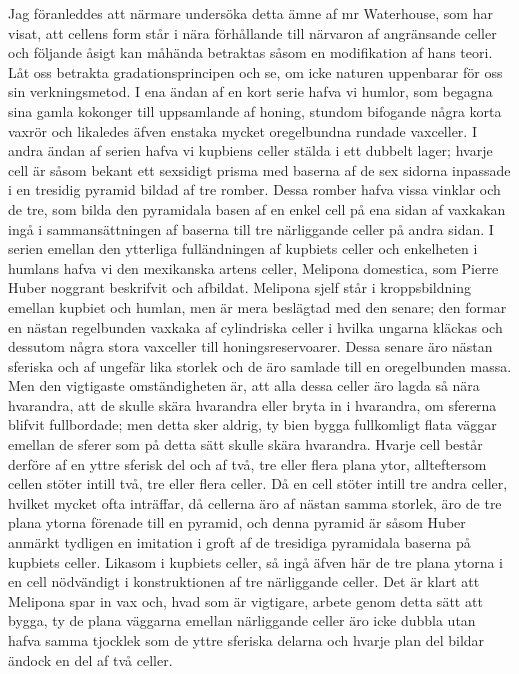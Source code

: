 Jag föranleddes att närmare undersöka detta ämne af mr Waterhouse, som har visat, att cellens form står i nära förhållande till närvaron af angränsande celler och följande åsigt kan måhända betraktas såsom en modifikation af hans teori. Låt oss betrakta gradationsprincipen och se, om icke naturen uppenbarar för oss sin verkningsmetod. I ena ändan af en kort serie hafva vi humlor, som begagna sina gamla kokonger till uppsamlande af honing, stundom bifogande några korta vaxrör och likaledes äfven enstaka mycket oregelbundna rundade vaxceller. I andra ändan af serien hafva vi kupbiens celler stälda i ett dubbelt lager; hvarje cell är såsom bekant ett sexsidigt prisma med baserna af de sex sidorna inpassade i en tresidig pyramid bildad af tre romber. Dessa romber hafva vissa vinklar och de tre, som bilda den pyramidala basen af en enkel cell på ena sidan af vaxkakan ingå i sammansättningen af baserna till tre närliggande celler på andra sidan. I serien emellan den ytterliga fulländningen af kupbiets celler och enkelheten i humlans hafva vi den mexikanska artens celler, Melipona domestica, som Pierre Huber noggrant beskrifvit och afbildat. Melipona sjelf står i kroppsbildning emellan kupbiet och humlan, men är mera beslägtad med den senare; den formar en nästan regelbunden vaxkaka af cylindriska celler i hvilka ungarna kläckas och dessutom några stora vaxceller till honingsreservoarer. Dessa senare äro nästan sferiska och af ungefär lika storlek och de äro samlade till en oregelbunden massa. Men den vigtigaste omständigheten är, att alla dessa celler äro lagda så nära hvarandra, att de skulle skära hvarandra eller bryta in i hvarandra, om sfererna blifvit fullbordade; men detta sker aldrig, ty bien bygga fullkomligt flata väggar emellan de sferer som på detta sätt skulle skära hvarandra. Hvarje cell består derföre af en yttre sferisk del och af två, tre eller flera plana ytor, allteftersom cellen stöter intill två, tre eller flera celler. Då en cell stöter intill tre andra celler, hvilket mycket ofta inträffar, då cellerna äro af nästan samma storlek, äro de tre plana ytorna förenade till en pyramid, och denna pyramid är såsom Huber anmärkt tydligen en imitation i groft af de tresidiga pyramidala baserna på kupbiets celler. Likasom i kupbiets celler, så ingå äfven här de tre plana ytorna i en cell nödvändigt i konstruktionen af tre närliggande celler. Det är klart att Melipona spar in vax och, hvad som är vigtigare, arbete genom detta sätt att bygga, ty de plana väggarna emellan närliggande celler äro icke dubbla utan hafva samma tjocklek som de yttre sferiska delarna och hvarje plan del bildar ändock en del af två celler.

